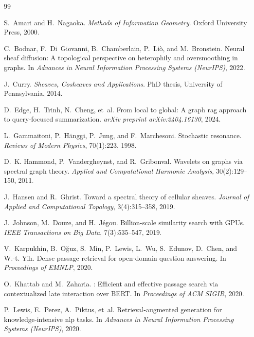 \documentclass[11pt,a4paper]{article}
\begin{document}

\begin{thebibliography}{99}

S.~Amari and H.~Nagaoka.
\newblock \emph{Methods of Information Geometry}.
\newblock Oxford University Press, 2000.

C.~Bodnar, F.~Di~Giovanni, B.~Chamberlain, P.~Li{\`o}, and M.~Bronstein.
\newblock Neural sheaf diffusion: A topological perspective on heterophily and oversmoothing in graphs.
\newblock In \emph{Advances in Neural Information Processing Systems (NeurIPS)}, 2022.

J.~Curry.
\newblock \emph{Sheaves, Cosheaves and Applications}.
\newblock PhD thesis, University of Pennsylvania, 2014.

D.~Edge, H.~Trinh, N.~Cheng, et~al.
\newblock From local to global: A graph rag approach to query-focused summarization.
\newblock \emph{arXiv preprint arXiv:2404.16130}, 2024.

L.~Gammaitoni, P.~H{\"a}nggi, P.~Jung, and F.~Marchesoni.
\newblock Stochastic resonance.
\newblock \emph{Reviews of Modern Physics}, 70(1):223, 1998.

D.~K. Hammond, P.~Vandergheynst, and R.~Gribonval.
\newblock Wavelets on graphs via spectral graph theory.
\newblock \emph{Applied and Computational Harmonic Analysis}, 30(2):129--150, 2011.

J.~Hansen and R.~Ghrist.
\newblock Toward a spectral theory of cellular sheaves.
\newblock \emph{Journal of Applied and Computational Topology}, 3(4):315--358, 2019.

J.~Johnson, M.~Douze, and H.~J{\'e}gou.
\newblock Billion-scale similarity search with {GPUs}.
\newblock \emph{IEEE Transactions on Big Data}, 7(3):535--547, 2019.

V.~Karpukhin, B.~O{\u{g}}uz, S.~Min, P.~Lewis, L.~Wu, S.~Edunov, D.~Chen, and W.-t. Yih.
\newblock Dense passage retrieval for open-domain question answering.
\newblock In \emph{Proceedings of EMNLP}, 2020.

O.~Khattab and M.~Zaharia.
: Efficient and effective passage search via contextualized late interaction over {BERT}.
\newblock In \emph{Proceedings of ACM SIGIR}, 2020.

P.~Lewis, E.~Perez, A.~Piktus, et~al.
\newblock Retrieval-augmented generation for knowledge-intensive nlp tasks.
\newblock In \emph{Advances in Neural Information Processing Systems (NeurIPS)}, 2020.


\end{thebibliography}
\end{document}
